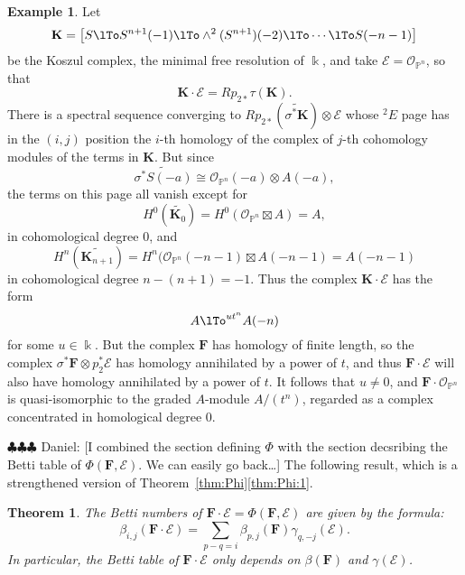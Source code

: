 \documentclass[12pt]{amsart}
\newtheorem{theorem}[lemma]{Theorem}
\theoremstyle{definition}
\newtheorem{example}[lemma]{Example}
\theoremstyle{remark}
\newcommand{\kk}{\Bbbk}
\newcommand{\PP}{\mathbb{P}}
\newcommand{\cO}{\mathcal{O}}
\newcommand{\cE}{\mathcal{E}}
\newcommand{\bK}{\mathbf{K}}
\newcommand{\FF}{\mathbf{F}}
\newcommand{\daniel}[1]{{\color{green} \sf $\clubsuit\clubsuit\clubsuit$ Daniel: [#1]}}
\begin{document}
\begin{example} Let 
$$
\bK = \bigl[ S\lTo S^{n+1}(-1) \lTo \wedge^{2}(S^{n+1})(-2) \lTo\cdots\lTo S(-n-1)\bigr]
$$
be the Koszul complex, the minimal free resolution of $\kk$, and take
$\cE = \cO_{\PP^{n}}$, so that 
$$
\bK \cdot \cE = Rp_{2*}\tau(\bK).$$  
There is a spectral sequence converging to $Rp_{2*}(\widetilde {\sigma^{*}\bK})\otimes \cE$
whose $^{2}E$ page has in the $(i,j)$ position the $i$-th homology of the complex
of $j$-th cohomology modules of the terms in $\bK$. But since
$$
\widetilde {\sigma^{*} S(-a)} \cong \cO_{\PP^{n}}(-a)\otimes A(-a),
$$
the terms on this page all vanish except for
$$
H^{0} (\widetilde{\bK_{0}}) = H^{0}(\cO_{\PP^{n}}\boxtimes A) = A,
$$
in cohomological degree 0, and 
$$
H^{n}(\widetilde{\bK_{n+1}}) = H^{n}(\cO_{\PP^{n}}(-n-1)\boxtimes A(-n-1) = A(-n-1)
$$
in cohomological degree $n-(n+1) = -1$.
Thus the complex $\bK \cdot \cE$ has the form
$$
A\lTo^{ut^{n}}A(-n)
$$
for some $u\in \kk$. But the complex $\FF$ has homology of finite length, so the complex $\sigma^{*}\FF \otimes p_{2}^{*}\cE$ has homology annihilated by a power of $t$, and thus $\FF\cdot \cE$ will also have homology annihilated by a power of $t$. It follows that $u\neq 0$, and $\FF\cdot \cO_{\PP^{n}}$ is quasi-isomorphic to the graded $A$-module $A/(t^{n})$, regarded as a complex concentrated in homological degree 0.
\end{example}


\daniel{I combined the section defining $\Phi$ with the section decsribing the Betti table of $\Phi(\FF,\cE)$.  We can easily go back\dots}
The following result, which is a strengthened version of Theorem~\ref{thm:Phi}\eqref{thm:Phi:1}.
\begin{theorem}\label{thm:betti numbers of pairing}
The Betti numbers of $\FF\cdot \cE = \Phi(\FF,\cE)$ are given by the formula:
\[
\beta_{i,j}(\FF\cdot \cE)=\sum_{p-q=i}  \beta_{p,j}(\FF)\gamma_{q,-j}(\cE).
\]
In particular, the Betti table of $\FF\cdot \cE$ only depends on $\beta(\FF)$ and $\gamma(\cE)$.
\end{theorem}
\end{document}
